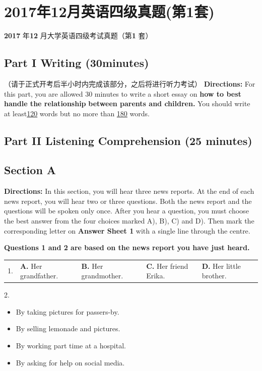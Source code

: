 \documentclass[UTF8,11pt]{ctexart}
\begin{document}
\section*{2017年12月英语四级真题(第1套)}
\textbf{2017} 年\textbf{12} 月大学英语四级考试真题（第\textbf{1} 套）


\subsection*{\textbf{Part I} \textbf{Writing} \textbf{(30minutes)}}


（请于正式开考后半小时内完成该部分，之后将进行听力考试） \textbf{Directions:} For this part, you are allowed 30 minutes to write a short essay on\textbf{ how to best handle the relationship} \textbf{between parents and children.} You should write at least\uline{120} words but no more than \uline{180} words.


\subsection*{\textbf{Part II} \textbf{Listening Comprehension} \textbf{(25 minutes)}}


\subsection*{\textbf{Section A}}


\textbf{Directions:} In this section, you will hear three news reports. At the end of each news report, you will hear two or three questions. Both the news report and the questions will be spoken only once. After you hear a question, you must choose the best answer from the four choices marked A), B), C) and D). Then mark the corresponding letter on\textbf{ Answer Sheet 1} with a single line through the centre.


\textbf{Questions 1 and 2 are based on the news report you have just heard.}


\noindent\begin{tabularx}{\linewidth}{@{}lXXXX@{}}1. & \textbf{A.} Her grandfather. & \textbf{B.} Her grandmother. & \textbf{C.} Her friend Erika. & \textbf{D.} Her little brother.\\\end{tabularx}\par

2.


\begin{itemize}[leftmargin=2em,itemsep=.2em,topsep=.4em]\item[A.] By taking pictures for passers-by.
\item[B.] By selling lemonade and pictures.
\item[C.] By working part time at a hospital.
\item[D.] By asking for help on social media.
\end{itemize}
\end{document}
